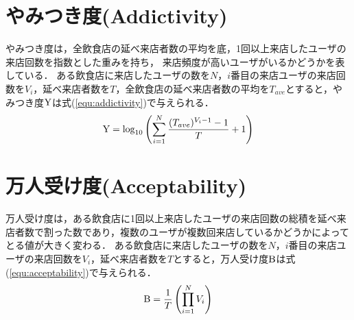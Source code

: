 \section{やみつき度(Addictivity)}

やみつき度は，全飲食店の延べ来店者数の平均を底，1回以上来店したユーザの来店回数を指数とした重みを持ち，
来店頻度が高いユーザがいるかどうかを表している．
ある飲食店に来店したユーザの数を$N$，$i$番目の来店ユーザの来店回数を$V_i$，延べ来店者数を$T$，全飲食店の延べ来店者数の平均を$T_{ave}$とすると，やみつき度$\rm Y$は式(\ref{equ:addictivity})で与えられる．
\begin{equation}
	\label{equ:addictivity}
	{\rm Y} = \log_{10}{\left(\sum^{N}_{i=1} \frac{(T_{ave})^{V_i-1}-1}{T}+1\right)}
\end{equation}

\section{万人受け度(Acceptability)}

万人受け度は，ある飲食店に1回以上来店したユーザの来店回数の総積を延べ来店者数で割った数であり，複数のユーザが複数回来店しているかどうかによってとる値が大きく変わる．
ある飲食店に来店したユーザの数を$N$，$i$番目の来店ユーザの来店回数を$V_i$，延べ来店者数を$T$とすると，万人受け度$\rm B$は式(\ref{equ:acceptability})で与えられる．
\begin{equation}
	\label{equ:acceptability}
	{\rm B} = \frac{1}{T} \left(\prod^N_{i=1}V_i\right)
\end{equation}

